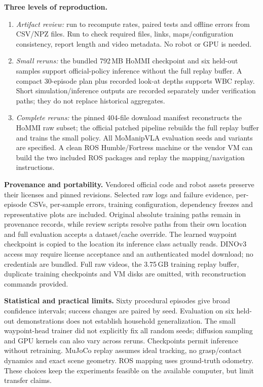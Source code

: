 \documentclass[10pt,a4paper]{article}
\begin{document}
\textbf{Three levels of reproduction.}
\begin{enumerate}
\setlength\itemsep{2pt}
\item \emph{Artifact review:} run  to recompute rates, paired tests and offline errors from CSV/NPZ files. Run  to check required files, links, maps/configuration consistency, report length and video metadata. No robot or GPU is needed.
\item \emph{Small reruns:} the bundled 792\,MB HoMMI checkpoint and six held-out samples support official-policy inference without the full replay buffer. A compact 30-episode plan plus recorded look-at depths supports WBC replay. Short simulation/inference outputs are recorded separately under verification paths; they do not replace historical aggregates.
\item \emph{Complete reruns:} the pinned 404-file download manifest reconstructs the HoMMI raw subset; the official patched pipeline rebuilds the full replay buffer and trains the small policy. All MoManipVLA evaluation seeds and variants are specified. A clean ROS Humble/Fortress machine or the vendor VM can build the two included ROS packages and replay the mapping/navigation instructions.
\end{enumerate}

\textbf{Provenance and portability.} Vendored official code and robot assets preserve their licenses and pinned revisions. Selected raw logs and failure evidence, per-episode CSVs, per-sample errors, training configuration, dependency freezes and representative plots are included. Original absolute training paths remain in provenance records, while review scripts resolve paths from their own location and full evaluation accepts a dataset/cache override. The learned waypoint checkpoint is copied to the location its inference class actually reads. DINOv3 access may require license acceptance and an authenticated model download; no credentials are bundled. Full raw videos, the 3.75\,GB training replay buffer, duplicate training checkpoints and VM disks are omitted, with reconstruction commands provided.

\textbf{Statistical and practical limits.} Sixty procedural episodes give broad confidence intervals; success changes are paired by seed. Evaluation on six held-out demonstrations does not establish household generalization. The small waypoint-head trainer did not explicitly fix all random seeds; diffusion sampling and GPU kernels can also vary across reruns. Checkpoints permit inference without retraining. MuJoCo replay assumes ideal tracking, no grasp/contact dynamics and exact scene geometry. ROS mapping uses ground-truth odometry. These choices keep the experiments feasible on the available computer, but limit transfer claims.
\end{document}
